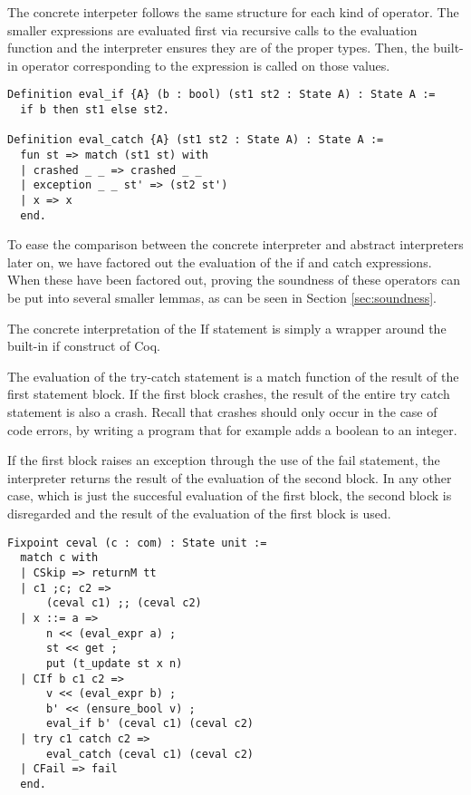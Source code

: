 The concrete interpeter follows the same structure for each kind of operator.
The smaller expressions are evaluated first via recursive calls to the
evaluation function and the interpreter
ensures they are of the proper types. Then, the built-in operator corresponding
to the expression is called on those values.

\begin{verbatim}
Definition eval_if {A} (b : bool) (st1 st2 : State A) : State A := 
  if b then st1 else st2.

Definition eval_catch {A} (st1 st2 : State A) : State A :=
  fun st => match (st1 st) with
  | crashed _ _ => crashed _ _
  | exception _ _ st' => (st2 st')
  | x => x
  end.
\end{verbatim}
To ease the comparison between the concrete interpreter and abstract
interpreters later on, we have factored out the evaluation of the if and catch
expressions. When these have been factored out, proving the soundness of these
operators can be put into several smaller lemmas, as can be seen in Section
\ref{sec:soundness}.

The concrete interpretation of the If statement is simply a wrapper around the
built-in if construct of Coq. 

The evaluation of the try-catch statement is a
match function of the result of the first statement block. If the first block
crashes, the result of the entire try catch statement is also a crash. Recall
that crashes should only occur in the case of code errors, by writing
a program that for example adds a boolean to an integer.

If the first block raises an exception through the use of the fail statement,
the interpreter returns the result of the evaluation of the second block. In
any other case, which is just the succesful evaluation of the first block, the
second block is disregarded and the result of the evaluation of the first block
is used.

\begin{verbatim}
Fixpoint ceval (c : com) : State unit :=
  match c with
  | CSkip => returnM tt
  | c1 ;c; c2 => 
      (ceval c1) ;; (ceval c2)
  | x ::= a => 
      n << (eval_expr a) ;
      st << get ;
      put (t_update st x n)
  | CIf b c1 c2 => 
      v << (eval_expr b) ;
      b' << (ensure_bool v) ;
      eval_if b' (ceval c1) (ceval c2)
  | try c1 catch c2 =>
   	  eval_catch (ceval c1) (ceval c2)
  | CFail => fail
  end.
\end{verbatim}

